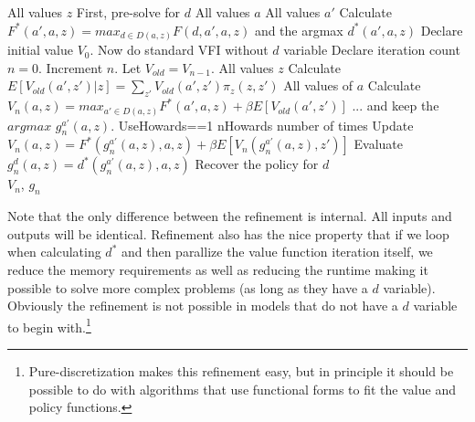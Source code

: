 \begin{algorithmic}
   \For All values $z$  \Comment First, pre-solve for $d$
    \For All values $a$
     \For All values $a'$
     \State Calculate $F^{*}(a',a,z)=max_{d \in D(a,z)} F(d,a',a,z)$ and the argmax $d^{*}(a',a,z)$
     \EndFor
    \EndFor
   \EndFor
 \State Declare initial value $V_0$. \Comment Now do standard VFI without $d$ variable
 \State Declare iteration count $n=0$.
   \State Increment $n$. Let $V_{old}=V_{n-1}$.
   \For All values $z$
    \State Calculate $E[V_{old}(a',z')|z]=\sum_{z'} V_{old}(a',z') \pi_z(z,z')$
    \For All values of $a$
     \State Calculate $V_n(a,z)=max_{a' \in D(a,z)} F^{*}(a',a,z)+\beta E[V_{old}(a',z')]$
     \State ... and keep the $argmax$ $g^{a'}_n(a,z)$.
     \EndFor
   \EndFor
   \If UseHowards==1
    \For nHowards number of times
     \State Update $V_n(a,z)=F^{*}(g^{a'}_n(a,z),a,z)+\beta E[V_n(g^{a'}_n(a,z),z')]$
    \EndFor
   \EndIf
 \EndWhile
 \State Evaluate $g_n^{d}(a,z)=d^{*}(g^{a'}_n(a,z),a,z)$  \Comment Recover the policy for $d$
 \\ \Return $V_n$, $g_n$
\end{algorithmic}

Note that the only difference between the refinement is internal. All inputs and outputs will be identical. Refinement also has the nice property that if we loop when calculating $d^{*}$ and then parallize the value function iteration itself, we reduce the memory requirements as well as reducing the runtime making it possible to solve more complex problems (as long as they have a $d$ variable). Obviously the refinement is not possible in models that do not have a $d$ variable to begin with.\footnote{Pure-discretization makes this refinement easy, but in principle it should be possible to do with algorithms that use functional forms to fit the value and policy functions.}

